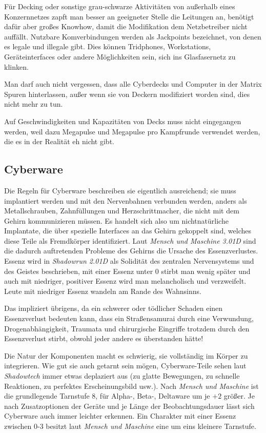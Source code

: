\documentclass[a4paper]{scrartcl}
\begin{document}
Für Decking oder sonstige grau-schwarze Aktivitäten von außerhalb eines Konzernnetzes zapft man besser an geeigneter Stelle
die Leitungen an, benötigt dafür aber großes Knowhow, damit die Modifikation dem Netzbetreiber nicht auffällt.
Nutzbare Komverbindungen werden als Jackpoints bezeichnet, von denen es legale und illegale gibt.
Dies können Tridphones, Workstations, Geräteinterfaces oder andere Möglichkeiten sein, sich ins Glasfasernetz zu klinken.

Man darf auch nicht vergessen, dass alle Cyberdecks und Computer in der Matrix Spuren hinterlassen, außer wenn sie von
Deckern modifiziert worden sind, dies nicht mehr zu tun.

Auf Geschwindigkeiten und Kapazitäten von Decks muss nicht eingegangen werden, weil dazu Megapulse und Megapulse pro
Kampfrunde verwendet werden, die es in der Realität eh nicht gibt.
 
\subsection{Cyberware}
Die Regeln für Cyberware beschreiben sie eigentlich ausreichend; sie muss implantiert werden und mit den Nervenbahnen
verbunden werden, anders als Metallschrauben, Zahnfüllungen und Herzschrittmacher, die nicht mit dem Gehirn kommunizieren
müssen.
Es handelt sich also um nichtnatürliche Implantate, die über spezielle Interfaces an das Gehirn gekoppelt sind, welches 
diese Teile als Fremdkörper identifiziert.
Laut \textit{Mensch und Maschine 3.01D} sind die dadurch auftretenden Probleme des Gehirns die Ursache des Essenzverlustes.
Essenz wird in \textit{Shadowrun 2.01D} als Solidität des zentralen Nervensystems und des Geistes beschrieben,
mit einer Essenz unter 0 stirbt man wenig später und auch mit niedriger, positiver Essenz wird man melancholisch und
verzweifelt.
Leute mit niedriger Essenz wandeln am Rande des Wahnsinns.

Das impliziert übrigens, da ein schwerer oder tödlicher Schaden einen Essenzverlust bedeuten kann, dass ein Straßensamurai
durch eine Verwundung, Drogenabhängigkeit, Traumata und chirurgische Eingriffe trotzdem durch den Essenzverlust stirbt,
obwohl jeder andere es überstanden hätte!

Die Natur der Komponenten macht es schwierig, sie vollständig im Körper zu integrieren. Wie gut sie auch getarnt sein mögen,
Cyberware-Teile sehen laut \textit{Shadowtech} immer etwas deplaziert aus (zu glatte Bewegungen, zu schnelle Reaktionen, zu
perfektes Erscheinungsbild usw.).
Nach \textit{Mensch und Maschine} ist die grundlegende Tarnstufe $8$, für Alpha-, Beta-, Deltaware um je $+2$ größer.
Je nach Zusatzoptionen der Geräte und je Länge der Beobachtungsdauer lässt sich Cyberware auch immer leichter erkennen.
Ein Charakter mit einer Essenz zwischen 0-3 besitzt laut \textit{Mensch und Maschine} eine um eins kleinere Tarnstufe.
\end{document}
